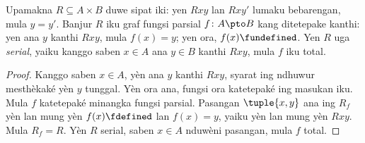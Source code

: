 \documentclass[../../../include/open-logic-section]{subfiles}
\begin{document}
\begin{prop}
Upamakna $R \subseteq A \times B$ duwe sipat iki: yen $Rxy$
lan $Rxy'$ lumaku bebarengan, mula $y = y'$. Banjur $R$ iku graf fungsi parsial
$f\colon A \pto B$ kang ditetepake kanthi: yen ana $y$ kanthi
$Rxy$, mula $f(x) = y$; yen ora, $f(x) \fundefined$. Yen $R$ uga
\emph{serial}, yaiku kanggo saben $x \in A$ ana $y \in B$ kanthi
$Rxy$, mula $f$ iku total.
\end{prop}

\begin{proof}
Kanggo saben $x \in A$, yèn ana $y$ kanthi $Rxy$, syarat ing ndhuwur
mesthèkaké yèn $y$ tunggal. Yèn ora ana, fungsi ora katetepaké ing masukan iku.
Mula $f$ katetepaké minangka fungsi parsial. Pasangan $\tuple{x,y}$ ana ing $R_f$ yèn lan mung yèn $f(x) \fdefined$ lan $f(x)=y$,
yaiku yèn lan mung yèn $Rxy$. Mula $R_f = R$.
Yèn $R$ serial, saben $x \in A$ nduwèni pasangan, mula $f$ total.
\end{proof}
\end{document}
